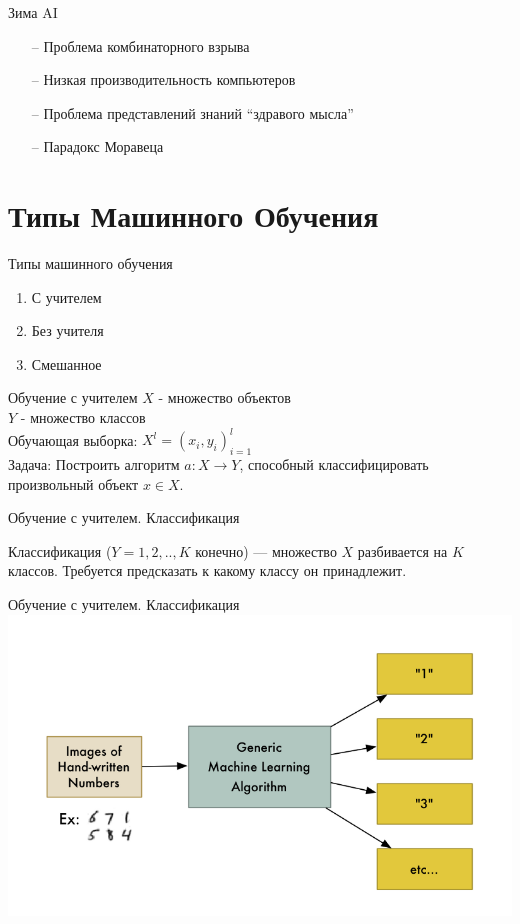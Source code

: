 \documentclass[10pt]{beamer}
\begin{document}
\begin{frame}{Зима AI}
	\begin{itemize}
	  \item[--] Проблема комбинаторного взрыва
	  \item[--] Низкая производительность компьютеров
	  \item[--] Проблема представлений знаний “здравого мысла”
	  \item[--] Парадокс Моравеца
	\end{itemize}
\end{frame}

\section{Типы Машинного Обучения}

\begin{frame}{Типы машинного обучения}
	\begin{enumerate}
	  \item С учителем
	  \item Без учителя
	  \item Смешанное
	\end{enumerate}
\end{frame}

\begin{frame}{Обучение с учителем }
	$X$ - множество объектов \\
	$Y$ - множество классов \\
	Обучающая выборка: ${X^l = (x_i, y_i)_{i=1}^l}$ \\ 
	\bigbreak
	\bigbreak
	\alert{Задача}: Построить алгоритм ${a \colon X \rightarrow Y}$, способный классифицировать произвольный объект ${x \in X}$.
\end{frame}

\begin{frame}{Обучение с учителем. Классификация}
  \begin{center}
    Классификация (${Y={1,2,..,K}}$ конечно) — множество $X$ разбивается на $K$ классов. Требуется предсказать к какому классу он принадлежит. 
  \end{center}
\end{frame}

\begin{frame}{Обучение с учителем. Классификация}
  \centering
  \includegraphics[width=0.9 \linewidth, height=0.9 \textheight, keepaspectratio]{images/mnist}\\
\end{frame}
\end{document}
